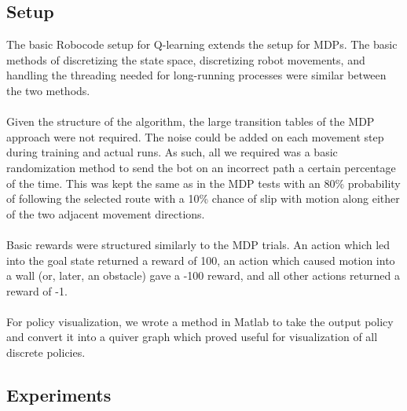 \documentclass{aiaa-tc}%
\begin{document}
\subsection{Setup}
The basic Robocode setup for Q-learning extends
the setup for MDPs. The basic methods of discretizing the state
space, discretizing robot movements, and handling the threading needed
for long-running processes were similar between the two methods. \\ \\
Given the structure of the algorithm, the large transition tables of
the MDP approach were not required. The noise could be added on each movement
step during training and actual runs. As such, all we required was a
basic randomization method to send the bot on an incorrect path a
certain percentage of the time. This was kept the same as in the MDP
tests with an 80\% probability of following the selected route with a
10\% chance of slip with motion along either of the two adjacent
movement directions. \\ \\
Basic rewards were structured similarly to the MDP trials. An action
which led into the goal state returned a reward of 100, an action
which caused motion into a
wall (or, later, an obstacle) gave a -100 reward, and all other
actions returned a reward of -1. \\ \\
For policy visualization, we wrote a method in Matlab to take the output
policy and convert it into a quiver graph which proved useful for
visualization of all discrete policies.

\subsection{Experiments}
\end{document}
